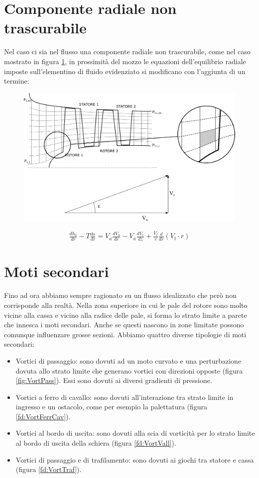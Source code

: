 \section{Componente radiale non trascurabile}
Nel caso ci sia nel flusso una componente radiale non trascurabile, come nel caso mostrato in figura \ref{fd:comp_rad}, in prossimità del mozzo le equazioni dell'equilibrio radiale imposte sull'elementino di fluido evidenziato si modificano con l'aggiunta di un termine:
\begin{figure}
\centering
  \includegraphics[width=.8\textwidth]{fig/comp_rad.pdf}
\caption{}
\label{fd:comp_rad}
\end{figure}
\begin{align*}
\frac{d h_0}{dr} - T\frac{ds}{dr} = V_a \frac{dV_a}{dr} - \boxed{V_a \frac{dV_r}{dz}} + \frac{V_t}{r} \frac{d}{dr} ( V_t \cdot r)
\end{align*}

\section{Moti secondari}
Fino ad ora abbiamo sempre ragionato su un flusso idealizzato che però non corrisponde alla realtà. Nella zona superiore in cui le pale del rotore sono molto vicine alla cassa e vicino alla radice delle pale, si forma lo strato limite a parete che innesca i moti secondari. Anche se questi nascono in zone limitate possono comunque influenzare grosse sezioni.
Abbiamo quattro diverse tipologie di moti secondari:
\begin{itemize}
\item Vortici di passaggio: sono dovuti ad un moto curvato e una perturbazione dovuta allo strato limite che generano vortici con direzioni opposte (figura \ref{fig:VortPass}). Essi sono dovuti ai diversi gradienti di pressione.
\item Vortici a ferro di cavallo: sono dovuti all'interazione tra strato limite in ingresso e un ostacolo, come per esempio la palettatura (figura \ref{fd:VortFerrCav}).
\item Vortici al bordo di uscita: sono dovuti alla scia di vorticità per lo strato limite al bordo di uscita della schiera (figura \ref{fd:VortVall}).
\item Vortici di passaggio e di trafilamento: sono dovuti ai giochi tra statore e cassa (figura \ref{fd:VortTraf}).
\end{itemize}

